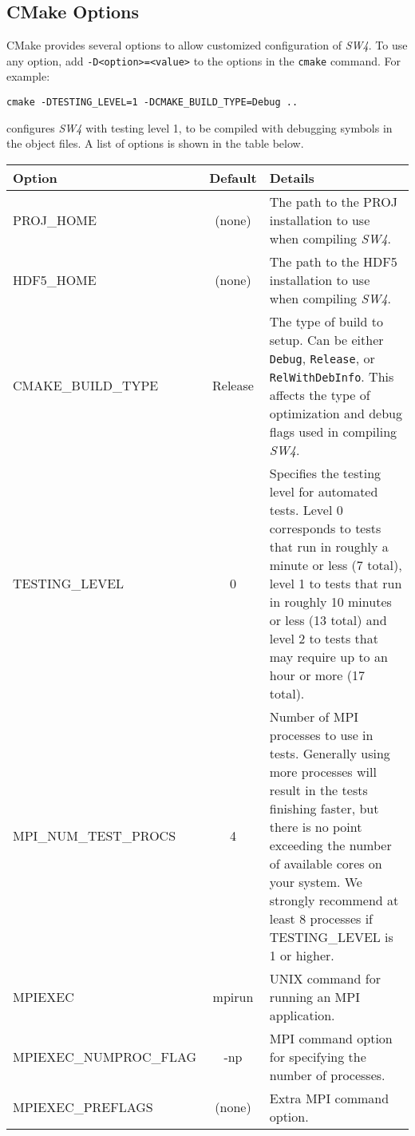 \documentclass[11pt]{article}
\begin{document}
\subsection{CMake Options}
CMake provides several options to allow customized configuration of \emph{SW4}.  To use any option,
add \texttt{-D\textless option\textgreater=\textless value\textgreater} to the options in the
\texttt{cmake} command.  For example:
%
\begin{verbatim}
cmake -DTESTING_LEVEL=1 -DCMAKE_BUILD_TYPE=Debug ..
\end{verbatim}
%
configures \emph{SW4} with testing level 1, to be compiled with debugging symbols in the object
files. A list of options is shown in the table below.
%
\begin{center}
\begin{tabular}{|l|c|p{}|}
\hline
Option & Default & Details \\
\hline
%
PROJ\_HOME & (none) & The path to the PROJ installation to use when compiling
\emph{SW4}. \\ \hline
%
HDF5\_HOME & (none) & The path to the HDF5 installation to use when compiling
\emph{SW4}. \\ \hline
%
CMAKE\_BUILD\_TYPE & Release & The type of build to setup. Can be either \texttt{Debug},
\texttt{Release}, or \texttt{RelWithDebInfo}.  This affects the type of optimization and debug flags
used in compiling \emph{SW4}. \\ \hline
%
TESTING\_LEVEL & 0 & Specifies the testing level for automated tests.  Level 0 corresponds to tests
that run in roughly a minute or less (7 total), level 1 to tests that run in roughly 10 minutes or
less (13 total) and level 2 to tests that may require up to an hour or more (17 total). \\ \hline
%
MPI\_NUM\_TEST\_PROCS & 4 & Number of MPI processes to use in tests. Generally using more processes
will result in the tests finishing faster, but there is no point exceeding the number of available
cores on your system.  We strongly recommend at least 8 processes if TESTING\_LEVEL is 1 or
higher.\\ \hline
%
%
MPIEXEC & mpirun & UNIX command for running an MPI application.\\ \hline
MPIEXEC\_NUMPROC\_FLAG & -np & MPI command option for specifying the number of processes.\\ \hline 
MPIEXEC\_PREFLAGS & (none) & Extra MPI command option.\\ \hline 
\end{tabular}
\end{center}
\end{document}

